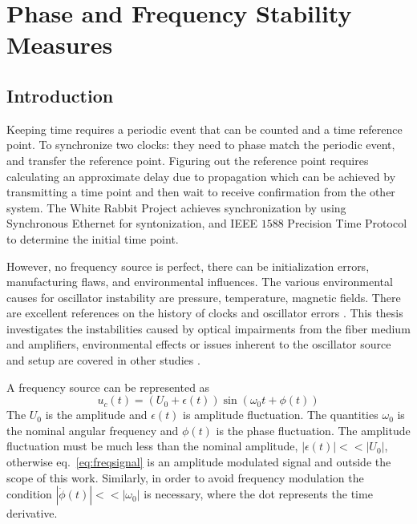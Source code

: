 \chapter{Phase and Frequency Stability Measures}
\label{chap:time_stability}

\section{Introduction}

Keeping time requires a periodic event that can be counted and a time reference point.  To synchronize two clocks: they need to phase match the periodic event, and transfer the reference point. Figuring out the reference point requires calculating an approximate delay due to propagation which can be achieved by transmitting a time point and then wait to receive confirmation from the other system. The White Rabbit Project achieves synchronization by using Synchronous Ethernet for syntonization, and IEEE $1588$ Precision Time Protocol \cite{Serrano2013} to determine the initial time point. 

However, no frequency source is perfect, there can be initialization errors, manufacturing flaws, and environmental influences. The various environmental causes for oscillator instability are pressure, temperature, magnetic fields. There are excellent references on the history of clocks and oscillator errors \cite{Leeson2016} \cite{Allan1997}.
This thesis investigates the instabilities caused by optical impairments from the fiber medium and amplifiers, environmental effects or issues inherent to the oscillator source and setup are covered in other studies \cite{blair1974time} \cite{Sliwczynski2010} \cite{Sliwczynski2015}.

A frequency source can be represented as 
%
\begin{equation}
	\label{eq:freqsignal}
	u_c(t) = (U_0 + \epsilon(t)) \sin(\omega_0t + \phi(t))
\end{equation}
%
The $U_0$ is the amplitude and $\epsilon(t)$ is amplitude fluctuation. The quantities $\omega_0$ is the nominal angular frequency and $\phi(t)$ is the phase fluctuation. The amplitude fluctuation must be much less than the nominal amplitude, $|\epsilon(t)| << |U_0|$, otherwise eq.~\ref{eq:freqsignal} is an amplitude modulated signal and outside the scope of this work.  Similarly, in order to avoid frequency modulation the condition $|\dot{\phi}(t)| << |\omega_0|$ is necessary, where the dot represents the time derivative.

